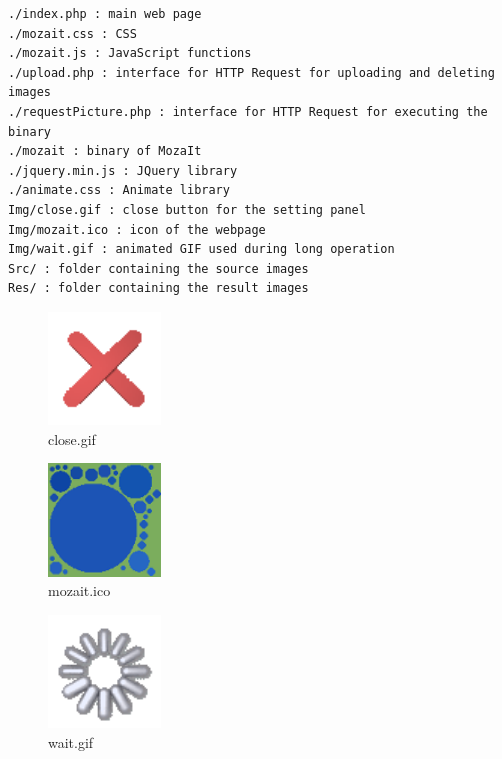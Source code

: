 \documentclass[12pt, a4paper]{article}
\begin{document}
\begin{scriptsize}
\begin{ttfamily}
\begin{lstlisting}
./index.php : main web page
./mozait.css : CSS
./mozait.js : JavaScript functions
./upload.php : interface for HTTP Request for uploading and deleting images
./requestPicture.php : interface for HTTP Request for executing the binary
./mozait : binary of MozaIt
./jquery.min.js : JQuery library
./animate.css : Animate library
Img/close.gif : close button for the setting panel
Img/mozait.ico : icon of the webpage
Img/wait.gif : animated GIF used during long operation
Src/ : folder containing the source images
Res/ : folder containing the result images
\end{lstlisting}
\end{ttfamily}
\end{scriptsize}

\begin{center}
\begin{figure}[H]
\centering
\includegraphics[width=3cm]{./close.png}\\
close.gif
\end{figure}
\end{center}

\begin{center}
\begin{figure}[H]
\centering
\includegraphics[width=3cm]{./mozait.png}\\
mozait.ico
\end{figure}
\end{center}

\begin{center}
\begin{figure}[H]
\centering
\includegraphics[width=3cm]{./wait.png}\\
wait.gif
\end{figure}
\end{center}
\end{document}
